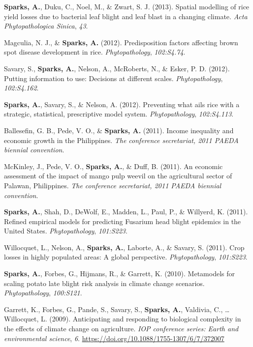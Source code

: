 \documentclass[11pt, a4paper]{awesome-cv}
\begin{document}
\leavevmode\hypertarget{ref-Sparks2013a}{}%
\textbf{Sparks, A.}, Duku, C., Noel, M., \& Zwart, S. J. (2013). Spatial modelling of rice yield losses due to bacterial leaf blight and leaf blast in a changing climate. \emph{Acta Phytopathologica Sinica}, \emph{43}.

\leavevmode\hypertarget{ref-Magculia2012}{}%
Magculia, N. J., \& \textbf{Sparks, A.} (2012). Predisposition factors affecting brown spot disease development in rice. \emph{Phytopathology}, \emph{102:S4.74}.

\leavevmode\hypertarget{ref-Savary2012}{}%
Savary, S., \textbf{Sparks, A.}, Nelson, A., McRoberts, N., \& Esker, P. D. (2012). Putting information to use: Decisions at different scales. \emph{Phytopathology}, \emph{102:S4.162}.

\leavevmode\hypertarget{ref-Sparks2012}{}%
\textbf{Sparks, A.}, Savary, S., \& Nelson, A. (2012). Preventing what ails rice with a strategic, statistical, prescriptive model system. \emph{Phytopathology}, \emph{102:S4.113}.

\leavevmode\hypertarget{ref-Ballesefin2011}{}%
Ballesefin, G. B., Pede, V. O., \& \textbf{Sparks, A.} (2011). Income inequality and economic growth in the Philippines. \emph{The conference secretariat, 2011 PAEDA biennial convention}.

\leavevmode\hypertarget{ref-McKinley2011}{}%
McKinley, J., Pede, V. O., \textbf{Sparks, A.}, \& Duff, B. (2011). An economic assessment of the impact of mango pulp weevil on the agricultural sector of Palawan, Philippines. \emph{The conference secretariat, 2011 PAEDA biennial convention}.

\leavevmode\hypertarget{ref-Sparks2011a}{}%
\textbf{Sparks, A.}, Shah, D., DeWolf, E., Madden, L., Paul, P., \& Willyerd, K. (2011). Refined empirical models for predicting Fusarium head blight epidemics in the United States. \emph{Phytopathology}, \emph{101:S223}.

\leavevmode\hypertarget{ref-Willocquet2011}{}%
Willocquet, L., Nelson, A., \textbf{Sparks, A.}, Laborte, A., \& Savary, S. (2011). Crop losses in highly populated areas: A global perspective. \emph{Phytopathology}, \emph{101:S223}.

\leavevmode\hypertarget{ref-Sparks2010}{}%
\textbf{Sparks, A.}, Forbes, G., Hijmans, R., \& Garrett, K. (2010). Metamodels for scaling potato late blight risk analysis in climate change scenarios. \emph{Phytopathology}, \emph{100:S121}.

\leavevmode\hypertarget{ref-Garrett2009}{}%
Garrett, K., Forbes, G., Pande, S., Savary, S., \textbf{Sparks, A.}, Valdivia, C., \ldots{} Willocquet, L. (2009). Anticipating and responding to biological complexity in the effects of climate change on agriculture. \emph{IOP conference series: Earth and environmental science}, \emph{6}. \url{https://doi.org/10.1088/1755-1307/6/7/372007}
\end{document}
